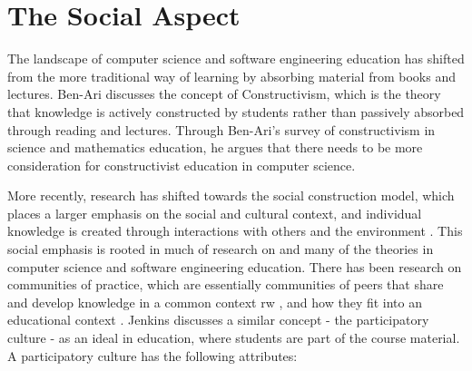 \section{The Social Aspect}
The landscape of computer science and software engineering education has shifted from the more traditional way of learning by absorbing material from books and lectures. Ben-Ari \cite{ben2001constructivism} discusses the concept of Constructivism, which is the theory that knowledge is actively constructed by students rather than passively absorbed through reading and lectures. Through Ben-Ari’s survey of constructivism in science and mathematics education, he argues that there needs to be more consideration for constructivist education in computer science.

More recently, research has shifted towards the social construction model, which places a larger emphasis on the social and cultural context, and individual knowledge is created through interactions with others and the environment \cite{kim2001social}. This social emphasis is rooted in much of research on and many of the theories in computer science and software engineering education. There has been research on communities of practice, which are essentially communities of peers that share and develop knowledge in a common context {rw} \cite{wenger1998communities}, and how they fit into an educational context \cite{ben2004situated}.
Jenkins \cite{jenkins2009confronting} discusses a similar concept - the participatory culture - as an ideal in education, where students are part of the course material. A participatory culture has the following attributes:

